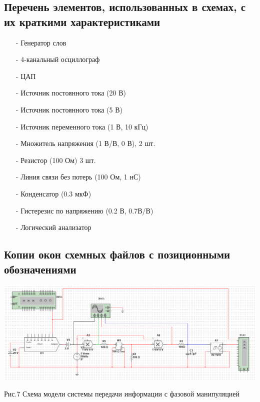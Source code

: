 \documentclass[11pt]{article}
\begin{document}
\subsection{Перечень элементов, использованных в схемах, с
их краткими характеристиками}
\begin{itemize}
    \item[-] Генератор слов 
    \item[-] 4-канальный осциллограф
    \item[-] ЦАП
    \item[-] Источник постоянного тока (20 В)
    \item[-] Источник постоянного тока (5 В)
    \item[-] Источник переменного тока (1 В, 10 кГц)
    \item[-] Множитель напряжения (1 В/В, 0 В), 2 шт. 
    \item[-] Резистор (100 Ом) 3 шт.
    \item[-] Линия связи без потерь (100 Ом, 1 нС)
    \item[-] Конденсатор (0.3 мкФ)
    \item[-] Гистерезис по напряжению (0.2 В, 0.7В/В)
    \item[-] Логический анализатор
\end{itemize}


\subsection{Копии окон схемных файлов с позиционными обозначениями}
\includegraphics[width=1\linewidth]{img/scheme3.png}
\begin{center}
    Рис.7 Схема модели системы передачи информации с фазовой манипуляцией
\end{center}
\end{document}
